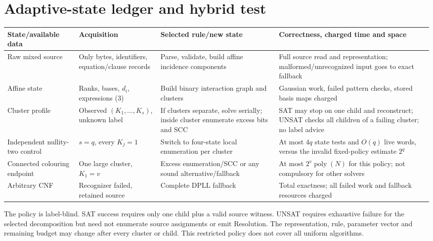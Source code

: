 \documentclass[11pt]{article}
\newcommand{\poly}{\operatorname{poly}}
\begin{document}
\section{Adaptive-state ledger and hybrid test}
\begin{center}\small
\begin{tabular}{p{.18\linewidth}p{.22\linewidth}p{.23\linewidth}p{.26\linewidth}}
\toprule
State/available data & Acquisition & Selected rule/new state & Correctness, charged time and space\\\midrule
Raw mixed source & Only bytes, identifiers, equation/clause records & Parse, validate, build affine incidence components & Full source read and representation; malformed/unrecognized input goes to exact fallback\\
Affine state & Ranks, bases, $d_i$, expressions (3) & Build binary interaction graph and clusters & Gaussian work, failed pattern checks, stored basis maps charged\\
Cluster profile & Observed $(K_1,\ldots,K_s)$, unknown label & If clusters separate, solve serially; inside cluster enumerate excess bits and SCC & SAT may stop on one child and reconstruct; UNSAT checks all children of a failing cluster; no label advice\\
Independent nullity-two control & $s=q$, every $K_j=1$ & Switch to four-state local enumeration per cluster & At most $4q$ state tests and $O(q)$ live words, versus the invalid fixed-policy estimate $2^q$\\
Connected colouring endpoint & One large cluster, $K_1=v$ & Excess enumeration/SCC or any sound alternative/fallback & At most $2^v\poly(N)$ for this policy; not compulsory for other solvers\\
Arbitrary CNF & Recognizer failed, retained source & Complete DPLL fallback & Total exactness; all failed work and fallback resources charged\\
\bottomrule
\end{tabular}
\end{center}

The policy is label-blind.  SAT success requires only one child plus a valid
source witness.  UNSAT requires exhaustive failure for the selected
decomposition but need not enumerate source assignments or emit Resolution.
The representation, rule, parameter vector and remaining budget may change
after every cluster or child.  This restricted policy does not cover all
uniform algorithms.
\end{document}
